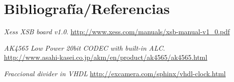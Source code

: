 \section{Bibliografía/Referencias}

\renewcommand*{\refname}{}


\begin{thebibliography}{9}


	\emph{Xess XSB board v1.0}.
	\url{http://www.xess.com/manuals/xsb-manual-v1_0.pdf}
 

	\emph{AK4565 Low Power 20bit CODEC with built-in ALC}.\\
	\url{http://www.asahi-kasei.co.jp/akm/en/product/ak4565/ak4565.html}

	\emph{Fraccional divider in VHDL}
	\url{http://excamera.com/sphinx/vhdl-clock.html}


\end{thebibliography}
